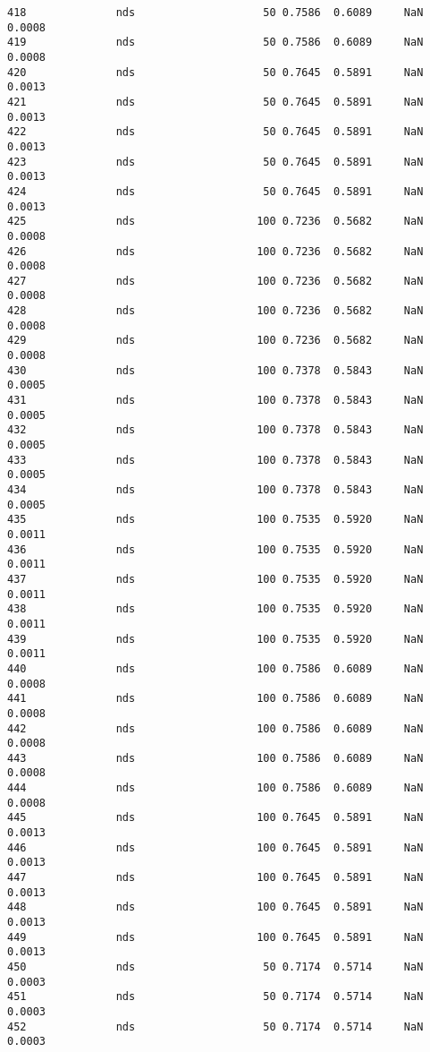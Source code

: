 \documentclass[11pt]{article}
\begin{document}
\begin{Verbatim}[commandchars=\\\{\}]
418              nds                    50 0.7586  0.6089     NaN 0.0008   
419              nds                    50 0.7586  0.6089     NaN 0.0008   
420              nds                    50 0.7645  0.5891     NaN 0.0013   
421              nds                    50 0.7645  0.5891     NaN 0.0013   
422              nds                    50 0.7645  0.5891     NaN 0.0013   
423              nds                    50 0.7645  0.5891     NaN 0.0013   
424              nds                    50 0.7645  0.5891     NaN 0.0013   
425              nds                   100 0.7236  0.5682     NaN 0.0008   
426              nds                   100 0.7236  0.5682     NaN 0.0008   
427              nds                   100 0.7236  0.5682     NaN 0.0008   
428              nds                   100 0.7236  0.5682     NaN 0.0008   
429              nds                   100 0.7236  0.5682     NaN 0.0008   
430              nds                   100 0.7378  0.5843     NaN 0.0005   
431              nds                   100 0.7378  0.5843     NaN 0.0005   
432              nds                   100 0.7378  0.5843     NaN 0.0005   
433              nds                   100 0.7378  0.5843     NaN 0.0005   
434              nds                   100 0.7378  0.5843     NaN 0.0005   
435              nds                   100 0.7535  0.5920     NaN 0.0011   
436              nds                   100 0.7535  0.5920     NaN 0.0011   
437              nds                   100 0.7535  0.5920     NaN 0.0011   
438              nds                   100 0.7535  0.5920     NaN 0.0011   
439              nds                   100 0.7535  0.5920     NaN 0.0011   
440              nds                   100 0.7586  0.6089     NaN 0.0008   
441              nds                   100 0.7586  0.6089     NaN 0.0008   
442              nds                   100 0.7586  0.6089     NaN 0.0008   
443              nds                   100 0.7586  0.6089     NaN 0.0008   
444              nds                   100 0.7586  0.6089     NaN 0.0008   
445              nds                   100 0.7645  0.5891     NaN 0.0013   
446              nds                   100 0.7645  0.5891     NaN 0.0013   
447              nds                   100 0.7645  0.5891     NaN 0.0013   
448              nds                   100 0.7645  0.5891     NaN 0.0013   
449              nds                   100 0.7645  0.5891     NaN 0.0013   
450              nds                    50 0.7174  0.5714     NaN 0.0003   
451              nds                    50 0.7174  0.5714     NaN 0.0003   
452              nds                    50 0.7174  0.5714     NaN 0.0003   

\end{Verbatim}
\end{document}
